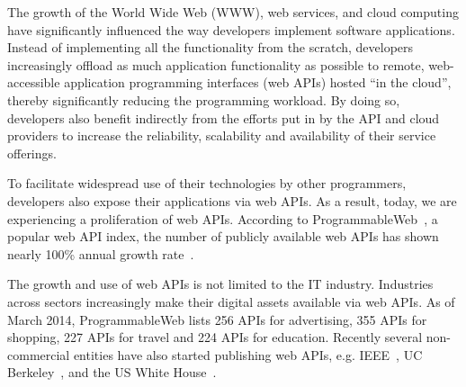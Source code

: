 The growth of the World Wide Web (WWW), web services, and cloud computing have significantly influenced the
way developers implement software applications. Instead of implementing all the functionality from
the scratch, developers increasingly offload
as much application functionality as possible to remote,
web-accessible application programming interfaces (web APIs) hosted ``in the
cloud'', thereby significantly reducing the 
programming workload. By doing so, developers also benefit indirectly from the efforts put in 
by the API and cloud providers to 
increase the reliability, scalability and availability of their service offerings. 

To facilitate widespread use of their technologies by other programmers, developers 
also expose their applications via web APIs.
As a result, today, we are experiencing a proliferation of web APIs. According to
ProgrammableWeb~\cite{pweb}, a popular web API index, the number of publicly available
web APIs has shown nearly 100\% annual growth rate~\cite{pweb_growth}. 

The growth and use of web APIs is not limited to the IT industry. 
Industries across sectors
increasingly make their digital assets available via web APIs. 
As of March 2014, ProgrammableWeb lists 256 APIs for advertising, 
355 APIs for shopping, 227 APIs for travel and 224 APIs for education.
Recently several non-commercial entities have also started publishing web 
APIs, e.g. IEEE~\cite{ieeeapis}, UC Berkeley~\cite{ucbapis}, and the US White
House~\cite{whitehouseapis}.  %

